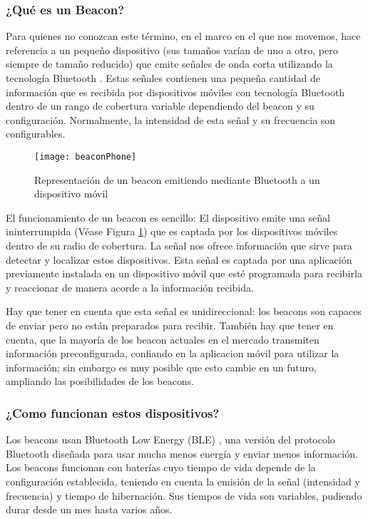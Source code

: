 \subsubsection{¿Qué es un Beacon?}

Para quienes no conozcan este término, en el marco en el que nos movemos, hace referencia a un pequeño dispositivo (sus tamaños varían de uno a otro, pero siempre de tamaño reducido) que emite señales de onda corta utilizando la tecnología Bluetooth \cite{URL::Bluetooth}. Estas señales contienen una pequeña cantidad de información que es recibida por dispositivos móviles con tecnología Bluetooth dentro de un rango de cobertura variable dependiendo del beacon y su configuración. Normalmente, la intensidad de esta señal y su frecuencia son configurables.

\begin{figure}[h]
	\centering
	\texttt{[image: beaconPhone]}
	\caption{Representación de un beacon emitiendo mediante Bluetooth a un dispositivo móvil}
	\label{fig:beaconBluetooth}
\end{figure}

El funcionamiento de un beacon es sencillo: El dispositivo emite una señal ininterrumpida (Véase Figura \ref{fig:beaconBluetooth}) que es captada por los dispositivos móviles dentro de su radio de cobertura. La señal nos ofrece información que sirve para detectar y localizar estos dispositivos. Esta señal es captada por una aplicación previamente instalada en un dispositivo móvil que esté programada para recibirla y reaccionar de manera acorde a la información recibida.


Hay que tener en cuenta que esta señal es unidireccional: los beacons son capaces de enviar pero no están preparados para recibir. También hay que tener en cuenta, que la mayoría de los beacon actuales en el mercado transmiten información preconfigurada, confiando en la aplicacion móvil para utilizar la información; sin embargo es muy posible que esto cambie en un futuro, ampliando las posibilidades de los beacons.

\subsubsection{¿Como funcionan estos dispositivos?}

Los beacons usan Bluetooth Low Energy (BLE) \cite{URL::BluetoothLowEnergy}, una versión del protocolo Bluetooth diseñada para usar mucha menos energía y enviar menos información. Los beacons funcionan con baterías cuyo tiempo de vida depende de la configuración establecida, teniendo en cuenta la emisión de la señal (intensidad y frecuencia) y tiempo de hibernación. Sus tiempos de vida son variables, pudiendo durar desde un mes hasta varios años. 

